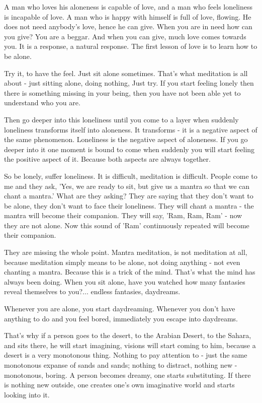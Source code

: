 A man who loves his aloneness is capable of love, and a man who feels loneliness is incapable of love. A man who is happy with himself is full of love, flowing. He does not need anybody's love, hence he can give. When you are in need how can you give? You are a beggar. And when you can give, much love comes towards you. It is a response, a natural response. The first lesson of love is to learn how to be alone.

Try it, to have the feel. Just sit alone sometimes. That's what meditation is all about - just sitting alone, doing nothing, Just try. If you start feeling lonely then there is something missing in your being, then you have not been able yet to understand who you are.

Then go deeper into this loneliness until you come to a layer when suddenly loneliness transforms itself into aloneness. It transforms - it is a negative aspect of the same phenomenon. Loneliness is the negative aspect of aloneness. If you go deeper into it one moment is bound to come when suddenly you will start feeling the positive aspect of it. Because both aspects are always together.

So be lonely, suffer loneliness. It is difficult, meditation is difficult. People come to me and they ask, 'Yes, we are ready to sit, but give us a mantra so that we can chant a mantra.' What are they asking? They are saying that they don't want to be alone, they don't want to face their loneliness. They will chant a mantra - the mantra will become their companion. They will say, 'Ram, Ram, Ram' - now they are not alone. Now this sound of 'Ram' continuously repeated will become their companion.

They are missing the whole point. Mantra meditation, is not meditation at all, because meditation simply means to be alone, not doing anything - not even chanting a mantra. Because this is a trick of the mind. That's what the mind has always been doing. When you sit alone, have you watched how many fantasies reveal themselves to you?... endless fantasies, daydreams.

Whenever you are alone, you start daydreaming. Whenever you don't have anything to do and you feel bored, immediately you escape into daydreams.

That's why if a person goes to the desert, to the Arabian Desert, to the Sahara, and sits there, he will start imagining, visions will start coming to him, because a desert is a very monotonous thing. Nothing to pay attention to - just the same monotonous expanse of sands and sands; nothing to distract, nothing new - monotonous, boring. A person becomes dreamy, one starts substituting. If there is nothing new outside, one creates one's own imaginative world and starts looking into it.

